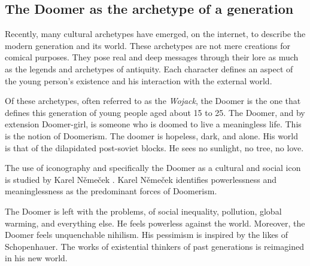 \documentclass[../report.tex]{subfiles}
\begin{document}
\subsection{The Doomer as the archetype of a generation}

Recently, many cultural archetypes have emerged, on the internet, to describe the modern generation and its world. 
These archetypes are not mere creations for comical purposes.
They pose real and deep messages through their lore as much as the legends and archetypes of antiquity.
Each character defines an aspect of the young person's existence and his interaction with the external world. 

Of these archetypes, often referred to as the \textit{Wojack}, the Doomer is the one that defines this generation of young people aged about 15 to 25.
The Doomer, and by extension Doomer-girl, is someone who is doomed to live a meaningless life.
This is the notion of Doomerism.
The doomer is hopeless, dark, and alone.
His world is that of the dilapidated post-soviet blocks.
He sees no sunlight, no tree, no love. 

The use of iconography and specifically the Doomer as a cultural and social icon is studied by Karel Němeček \cite{memes_reservoir}. Karel Němeček identifies powerlessness and meaninglessness as the predominant forces of Doomerism. 

The Doomer is left with the problems, of social inequality, pollution, global warming, and everything else.
He feels powerless against the world.
Moreover, the Doomer feels unquenchable nihilism. His pessimism is inspired by the likes of Schopenhauer.
The works of existential thinkers of past generations is reimagined in his new world. 


\end{document}
